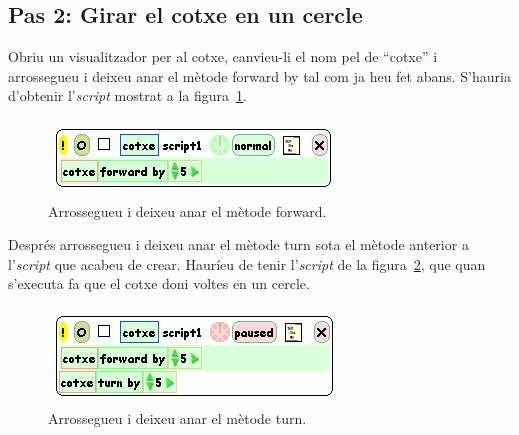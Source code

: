 \subsection{Pas 2: Girar el cotxe en un cercle}
Obriu un visualitzador per al cotxe, canvieu-li el nom pel de ``cotxe'' i arrossegueu i deixeu anar el mètode \textsf{forward by} tal com ja heu fet abans. S'hauria d'obtenir l'\emph{script} mostrat a la figura~\ref{fig2433}.
\begin{figure}[h!]
\begin{center}
\includegraphics[scale=0.6]{Imatges/figura24-33}
\end{center}
\caption{Arrossegueu i deixeu anar el mètode \textsf{\upshape forward}.}
\label{fig2433}
\end{figure}

Després arrossegueu i deixeu anar el mètode \textsf{turn} sota el mètode anterior a l'\emph{script} que acabeu de crear. Hauríeu de tenir l'\emph{script} de la figura~\ref{fig2434}, que quan s'executa fa que el cotxe doni voltes en un cercle.
\begin{figure}[h!]
\begin{center}
\includegraphics[scale=0.6]{Imatges/figura24-34}
\end{center}
\caption{Arrossegueu i deixeu anar el mètode \textsf{\upshape turn}.}
\label{fig2434}
\end{figure}


